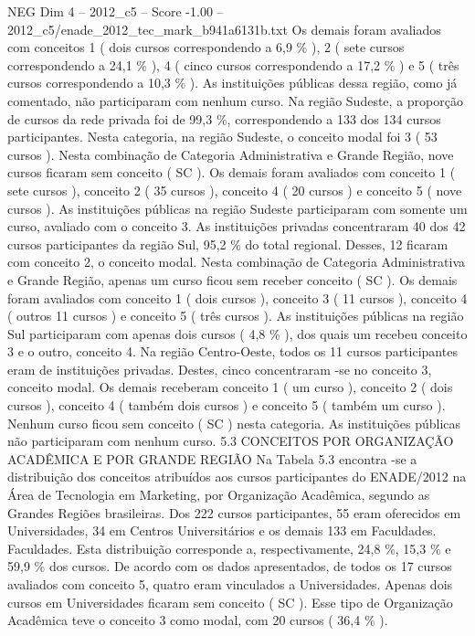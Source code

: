 \begin{textsample}{NEG Dim 4 – 2012\_c5 – Score -1.00 – 2012\_c5/enade\_2012\_tec\_mark\_b941a6131b.txt}
Os demais foram avaliados com conceitos 1 ( dois cursos correspondendo a 6,9 \% ), 2 ( sete cursos correspondendo a 24,1 \% ), 4 ( cinco cursos correspondendo a 17,2 \% ) e 5 ( três cursos correspondendo a 10,3 \% ).
As instituições públicas dessa região, como já comentado, não participaram com nenhum curso.
Na região Sudeste, a proporção de cursos da rede privada foi de 99,3 \%, correspondendo a 133 dos 134 cursos participantes.
Nesta categoria, na região Sudeste, o conceito modal foi 3 ( 53 cursos ).
Nesta combinação de Categoria Administrativa e Grande Região, nove cursos ficaram sem conceito ( SC ).
Os demais foram avaliados com conceito 1 ( sete cursos ), conceito 2 ( 35 cursos ), conceito 4 ( 20 cursos ) e conceito 5 ( nove cursos ).
As instituições públicas na região Sudeste participaram com somente um curso, avaliado com o conceito 3.
As instituições privadas concentraram 40 dos 42 cursos participantes da região Sul, 95,2 \% do total regional.
Desses, 12 ficaram com conceito 2, o conceito modal.
Nesta combinação de Categoria Administrativa e Grande Região, apenas um curso ficou sem receber conceito ( SC ).
Os demais foram avaliados com conceito 1 ( dois cursos ), conceito 3 ( 11 cursos ), conceito 4 ( outros 11 cursos ) e conceito 5 ( três cursos ).
As instituições públicas na região Sul participaram com apenas dois cursos ( 4,8 \% ), dos quais um recebeu conceito 3 e o outro, conceito 4.
Na região Centro-Oeste, todos os 11 cursos participantes eram de instituições privadas.
Destes, cinco concentraram -se no conceito 3, conceito modal.
Os demais receberam conceito 1 ( um curso ), conceito 2 ( dois cursos ), conceito 4 ( também dois cursos ) e conceito 5 ( também um curso ).
Nenhum curso ficou sem conceito ( SC ) nesta categoria.
As instituições públicas não participaram com nenhum curso. 5.3 CONCEITOS POR ORGANIZAÇÃO ACADÊMICA E POR GRANDE REGIÃO Na Tabela 5.3 encontra -se a distribuição dos conceitos atribuídos aos cursos participantes do ENADE/2012 na Área de Tecnologia em Marketing, por Organização Acadêmica, segundo as Grandes Regiões brasileiras.
Dos 222 cursos participantes, 55 eram oferecidos em Universidades, 34 em Centros Universitários e os demais 133 em Faculdades.
Faculdades.
Esta distribuição corresponde a, respectivamente, 24,8 \%, 15,3 \% e 59,9 \% dos cursos.
De acordo com os dados apresentados, de todos os 17 cursos avaliados com conceito 5, quatro eram vinculados a Universidades.
Apenas dois cursos em Universidades ficaram sem conceito ( SC ).
Esse tipo de Organização Acadêmica teve o conceito 3 como modal, com 20 cursos ( 36,4 \% ).

\end{textsample}
